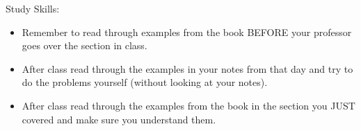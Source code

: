 \documentclass[letterpaper,12pt]{article}
\begin{document}
\noindent
Study Skills:
	\begin{itemize}
		\item Remember to read through examples from the book BEFORE your professor goes over the section in class.
		\item After class read through the examples in your notes from that day and try to do the problems yourself (without looking at your notes).
		\item After class read through the examples from the book in the section you JUST covered and make sure you understand them.
	\end{itemize}
\end{document}
